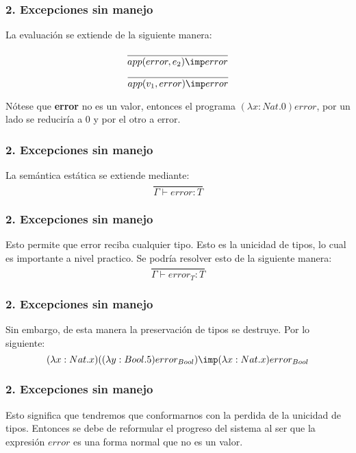 \documentclass[xcolor=dvipsnames,table,spanish]{beamer}
\begin{document}
\begin{frame}
\frametitle{2. Excepciones sin manejo}
 La evaluación se extiende de la siguiente manera:
  \begin{center}
      \begin{equation*}
         \frac{}{app(error,e_2)\imp error}
	  \end{equation*}
      \begin{equation*}
         \frac{}{app(v_1,error)\imp error}
	  \end{equation*}
  \end{center}
Nótese que \textbf{error} no es un valor, entonces el programa $(\lambda x: Nat.0)error$, por un lado se reduciría a 0 y por el otro a error.
\end{frame}

\begin{frame}
\frametitle{2. Excepciones sin manejo}
	La semántica estática se extiende mediante:
	\begin{equation*}
         \frac{}{\Gamma \vdash error : T}
	\end{equation*}

\end{frame}

\begin{frame}
\frametitle{2. Excepciones sin manejo}
 Esto permite que error reciba cualquier tipo. Esto es la unicidad de tipos, lo cual es importante a nivel practico. Se podría resolver esto de la siguiente manera:
    \begin{equation*}
         \frac{}{\Gamma \vdash error_T: T}
	\end{equation*}
\end{frame}

\begin{frame}
\frametitle{2. Excepciones sin manejo}
Sin embargo, de esta manera la preservación de tipos se destruye. Por lo siguiente:
    \begin{equation*}
         (\lambda x: Nat.x)((\lambda y:Bool.5)error_{Bool})\imp(\lambda x: Nat.x) error_{Bool}
	\end{equation*}
\end{frame}

\begin{frame}
\frametitle{2. Excepciones sin manejo}
Esto significa que tendremos que conformarnos con la perdida de la unicidad de tipos. Entonces se debe de reformular el progreso del sistema al ser que la expresión $error$ es una forma normal que no es un valor.
\end{frame}
\end{document}
